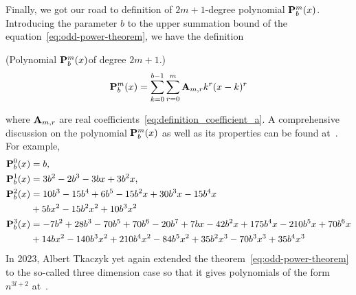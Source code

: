 Finally, we got our road to definition of $2m+1$-degree polynomial ${\mathbf{P}}\sp{m} \sb{b}(x)$.
Introducing the parameter $b$ to the upper summation bound of the equation~\eqref{eq:odd-power-theorem},
we have the definition
\begin{defn} (Polynomial ${\mathbf{P}}\sp{m} \sb{b}(x) $of degree $2m+1$.)
    \begin{equation}
        {\mathbf{P}}\sp{m} \sb{b}(x) = \sum_{k=0}^{b-1} \sum_{r=0}^{m} {\mathbf{A}} \sb{m,r} k^r(x-k)^r
        \label{eq:definition_polynomial_p}
    \end{equation}
\end{defn}
where ${\mathbf{A}} \sb{m,r}$ are real coefficients~\eqref{eq:definition_coefficient_a}.
A comprehensive discussion on the polynomial ${\mathbf{P}}\sp{m} \sb{b}(x)$ as well as its properties can be found at~\cite{on_the_link_between_binomial_theorem_and_discrete_convolution}.
For example,
\begin{align*}
    {\mathbf{P}}\sp{0} \sb{b}(x)
    &=b, \\
    {\mathbf{P}}\sp{1} \sb{b}(x)
    &=3 b^2 - 2 b^3 - 3 b x + 3 b^2 x, \\
    {\mathbf{P}}\sp{2} \sb{b}(x)
    &=10 b^3 - 15 b^4 + 6 b^5 - 15 b^2 x + 30 b^3 x - 15 b^4 x \\
    &+ 5 b x^2 - 15 b^2 x^2 + 10 b^3 x^2 \\
    {\mathbf{P}}\sp{3} \sb{b}(x)
    &=-7 b^2 + 28 b^3 - 70 b^5 + 70 b^6 - 20 b^7 + 7 b x - 42 b^2 x + 175 b^4 x - 210 b^5 x + 70 b^6 x \\
    &+ 14 b x^2 - 140 b^3 x^2 + 210 b^4 x^2 - 84 b^5 x^2 + 35 b^2 x^3 - 70 b^3 x^3 + 35 b^4 x^3
\end{align*}
In 2023, Albert Tkaczyk yet again extended the theorem~\eqref{eq:odd-power-theorem} to the so-called three dimension case
so that it gives polynomials of the form $n^{3l+2}$ at~\cite{albert_tkaczyk_2023_8371454}.

